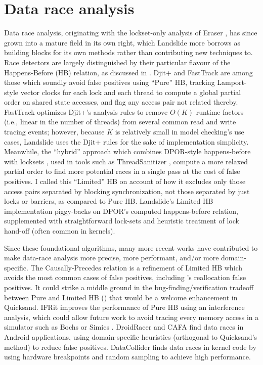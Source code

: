 \section{Data race analysis}
\label{sec:related-data-race}

Data race analysis, originating with the lockset-only analysis of Eraser \cite{eraser},
has since grown into a mature field in its own right,
which Landslide more borrows as building blocks for its own methods rather than contributing new techniques to.
Race detectors are largely distinguished by their particular flavour of the Happens-Before (HB) relation,
as discussed in \sect{\ref{sec:background-hb}}.
Djit+ \cite{djit} and FastTrack \cite{fasttrack} are among those
which soundly avoid false positives using ``Pure'' HB,
tracking Lamport-style vector clocks \cite{lamport-clocks}
for each lock and each thread to compute a global partial order on shared state accesses,
and flag any access pair not related thereby.
FastTrack optimizes Djit+'s analysis rules to remove $O(K)$ runtime factors (i.e., linear in the number of threads)
from several common read and write tracing events;
however, because $K$ is relatively small in model checking's use cases,
Landslide uses the Djit+ rules for the sake of implementation simplicity.
Meanwhile, the ``hybrid'' approach which combines DPOR-style happens-before with locksets \cite{hybriddatarace},
used in tools such as ThreadSanitizer \cite{tsan},
compute a more relaxed partial order to find more potential races in a single pass at the cost of false positives.
I called this ``Limited'' HB on account of how it excludes only those access pairs separated by blocking synchronization,
not those separated by just locks or barriers,
as compared to Pure HB.
Landslide's Limited HB implementation piggy-backs on DPOR's computed happens-before relation,
supplemented with straightforward lock-sets and heuristic treatment of lock hand-off
(often common in kernels).

Since these foundational algorithms,
many more recent works have contributed to make data-race analysis more precise, more performant,
and/or more domain-specific.
The Causally-Precedes relation \cite{predictive-dr} is a refinement of Limited HB which avoids the most common cases of false positives,
including \sect{\ref{sec:quicksand-soundness}}'s reallocation false positives.
It could strike a middle ground in the bug-finding/verification tradeoff
between Pure and Limited HB (\sect{\ref{sec:quicksand-eval}})
that would be a welcome enhancement in Quicksand.
IFRit \cite{ifrit}
improves the performance of Pure HB using an interference analysis,
which could allow future work to avoid tracing every memory access in a simulator such as Bochs \cite{bochs} or Simics \cite{simics}.
%
DroidRacer \cite{droidracer} and CAFA \cite{cafa} find data races in Android applications,
using domain-specific heuristics (orthogonal to Quicksand's method) to reduce false positives.
DataCollider \cite{datacollider} finds data races in kernel code
by using hardware breakpoints and random sampling to achieve high performance.

